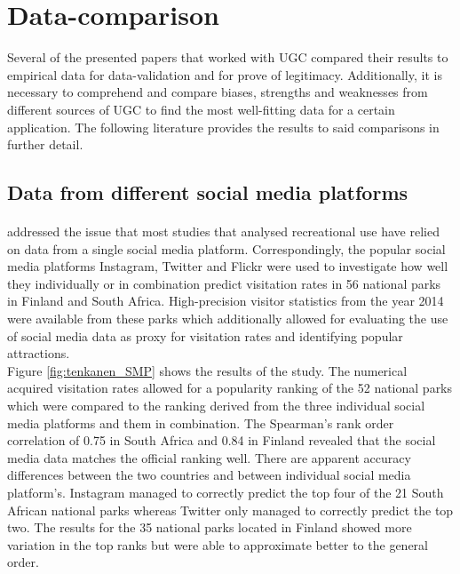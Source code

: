 \section{Data-comparison} \label{data_comparison_SotA}
Several of the presented papers that worked with UGC compared their results to empirical data for data-validation and for prove of legitimacy. Additionally, it is necessary to comprehend and compare biases, strengths and weaknesses from different sources of UGC to find the most well-fitting data for a certain application. The following literature provides the results to said comparisons in further detail.

\subsection{Data from different social media platforms} \label{SMP_vs_SMP}

\paragraph*{\textcite{Tenkanen2017}} addressed the issue that most studies that analysed recreational use have relied on data from a single social media platform. Correspondingly, the popular social media platforms Instagram, Twitter and Flickr were used to investigate how well they individually or in combination predict visitation rates in 56 national parks in Finland and South Africa. High-precision visitor statistics from the year 2014 were available from these parks which additionally allowed for evaluating the use of social media data as proxy for visitation rates and identifying popular attractions.\\
Figure \ref{fig:tenkanen_SMP} shows the results of the study. The numerical acquired visitation rates allowed for a popularity ranking of the 52 national parks which were compared to the ranking derived from the three individual social media platforms and them in combination. The Spearman's rank order correlation of 0.75 in South Africa and 0.84 in Finland revealed that the social media data matches the official ranking well. There are apparent accuracy differences between the two countries and between individual social media platform's. Instagram managed to correctly predict the top four of the 21 South African national parks whereas Twitter only managed to correctly predict the top two. The results for the 35 national parks located in Finland showed more variation in the top ranks but were able to approximate better to the general order.

